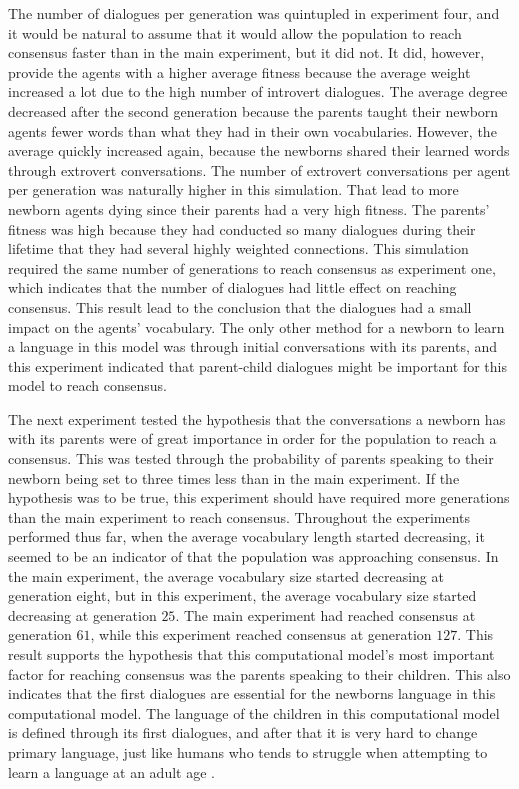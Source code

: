 The number of dialogues per generation was quintupled in experiment four, and it would be natural to assume that it would allow the population to reach consensus faster than in the main experiment, but it did not. It did, however, provide the agents with a higher average fitness because the average weight increased a lot due to the high number of introvert dialogues. The average degree decreased after the second generation because the parents taught their newborn agents fewer words than what they had in their own vocabularies. However, the average quickly increased again, because the newborns shared their learned words through extrovert conversations. The number of extrovert conversations per agent per generation was naturally higher in this simulation. That lead to more newborn agents dying since their parents had a very high fitness. The parents' fitness was high because they had conducted so many dialogues during their lifetime that they had several highly weighted connections. This simulation required the same number of generations to reach consensus as experiment one, which indicates that the number of dialogues had little effect on reaching consensus. This result lead to the conclusion that the dialogues had a small impact on the agents' vocabulary. The only other method for a newborn to learn a language in this model was through initial conversations with its parents, and this experiment indicated that parent-child dialogues might be important for this model to reach consensus.  

The next experiment tested the hypothesis that the conversations a newborn has with its parents were of great importance in order for the population to reach a consensus. This was tested through the probability of parents speaking to their newborn being set to three times less than in the main experiment. If the hypothesis was to be true, this experiment should have required more generations than the main experiment to reach consensus. Throughout the experiments performed thus far, when the average vocabulary length started decreasing, it seemed to be an indicator of that the population was approaching consensus. In the main experiment, the average vocabulary size started decreasing at generation eight, but in this experiment, the average vocabulary size started decreasing at generation $25$. The main experiment had reached consensus at generation $61$, while this experiment reached consensus at generation $127$. This result supports the hypothesis that this computational model's most important factor for reaching consensus was the parents speaking to their children. This also indicates that the first dialogues are essential for the newborns language in this computational model. The language of the children in this computational model is defined through its first dialogues, and after that it is very hard to change primary language, just like humans who tends to struggle when attempting to learn a language at an adult age . 

